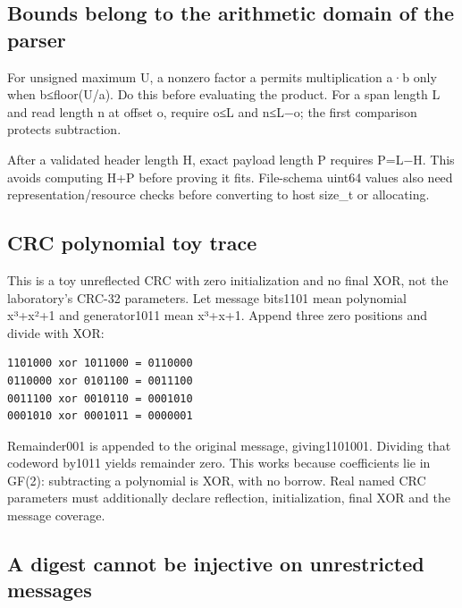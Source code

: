 \hypertarget{03-visual-computing-i-ch018-external-bytes---bounds-identity-and-error-detection}{}

\subsection{Bounds belong to the arithmetic domain of the parser}\label{03-visual-computing-i-ch018-bounds-belong-to-the-arithmetic-domain-of-the-parser}

\hypertarget{03-visual-computing-i-ch018-bounds-belong-to-the-arithmetic-domain-of-the-parser}{}

For unsigned maximum U, a nonzero factor a permits multiplication a·b only when b≤floor(U/a). Do this before evaluating the product. For a span length L and read length n at offset o, require o≤L and n≤L−o; the first comparison protects subtraction.

After a validated header length H, exact payload length P requires P=L−H. This avoids computing H+P before proving it fits. File-schema uint64 values also need representation/resource checks before converting to host size\_t or allocating.

\subsection{CRC polynomial toy trace}\label{03-visual-computing-i-ch018-crc-polynomial-toy-trace}

\hypertarget{03-visual-computing-i-ch018-crc-polynomial-toy-trace}{}

This is a toy unreflected CRC with zero initialization and no final XOR, not the laboratory's CRC-32 parameters. Let message bits1101 mean polynomial x³+x²+1 and generator1011 mean x³+x+1. Append three zero positions and divide with XOR:

\begin{verbatim}
1101000 xor 1011000 = 0110000
0110000 xor 0101100 = 0011100
0011100 xor 0010110 = 0001010
0001010 xor 0001011 = 0000001
\end{verbatim}

Remainder001 is appended to the original message, giving1101001. Dividing that codeword by1011 yields remainder zero. This works because coefficients lie in GF(2): subtracting a polynomial is XOR, with no borrow. Real named CRC parameters must additionally declare reflection, initialization, final XOR and the message coverage.

\subsection{A digest cannot be injective on unrestricted messages}\label{03-visual-computing-i-ch018-a-digest-cannot-be-injective-on-unrestricted-messages}

